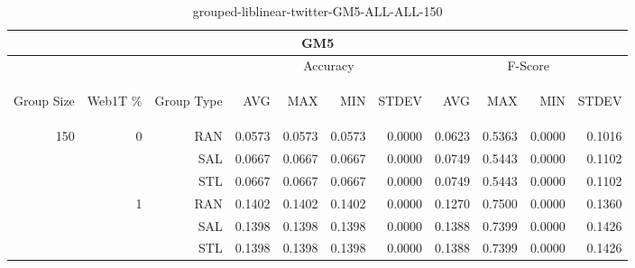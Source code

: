 \begin{center}
\begin{table}[htbp] 
 \begin{center}
\begin{tabular}{ | r | r | r | r | r | r | r | r | r | r | r |}
\hline
\multicolumn{11}{|c|}{GM5}\\
\hline
 & & & \multicolumn{4}{|c|}{Accuracy} & \multicolumn{4}{|c|}{F-Score}\\ \cline{4-11}
\begin{sideways}Group Size\end{sideways} & \begin{sideways}Web1T \%\end{sideways} & \begin{sideways}Group Type\end{sideways} & \begin{sideways}AVG\end{sideways} & \begin{sideways}MAX\end{sideways} & \begin{sideways}MIN\end{sideways} & \begin{sideways}STDEV\end{sideways} & \begin{sideways}AVG\end{sideways} & \begin{sideways}MAX\end{sideways} & \begin{sideways}MIN\end{sideways} & \begin{sideways}STDEV\end{sideways}\\
\hline
\multirow{6}{*}{150}
 & \multirow{3}{*}{0} & RAN & 0.0573 & 0.0573 & 0.0573 & 0.0000 & 0.0623 & 0.5363 & 0.0000 & 0.1016\\ \cline{3-11}
 &   & SAL & 0.0667 & 0.0667 & 0.0667 & 0.0000 & 0.0749 & 0.5443 & 0.0000 & 0.1102\\ \cline{3-11}
 &   & STL & 0.0667 & 0.0667 & 0.0667 & 0.0000 & 0.0749 & 0.5443 & 0.0000 & 0.1102\\ \cline{2-11}
 & \multirow{3}{*}{1} & RAN & 0.1402 & 0.1402 & 0.1402 & 0.0000 & 0.1270 & 0.7500 & 0.0000 & 0.1360\\ \cline{3-11}
 &   & SAL & 0.1398 & 0.1398 & 0.1398 & 0.0000 & 0.1388 & 0.7399 & 0.0000 & 0.1426\\ \cline{3-11}
 &   & STL & 0.1398 & 0.1398 & 0.1398 & 0.0000 & 0.1388 & 0.7399 & 0.0000 & 0.1426\\ \cline{2-11}
\hline
\end{tabular}
\caption{grouped-liblinear-twitter-GM5-ALL-ALL-150}
\end{center}
 \end{table}
\end{center}

